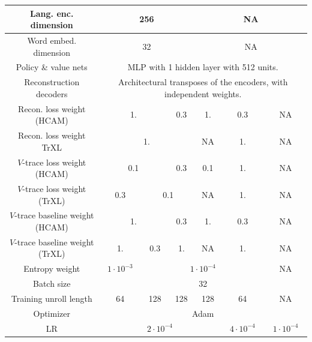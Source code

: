 \begin{table}[H]
{\begin{tabular}{|c|c|c|c|c|c|c|}
      Lang. enc. dimension & \multicolumn{3}{c|}{256} & \multicolumn{3}{c|}{NA} \\ \hline
      Word embed. dimension & \multicolumn{3}{c|}{32} & \multicolumn{3}{c|}{NA} \\ \hline
      \hline
      Policy \& value nets & \multicolumn{6}{c|}{MLP with 1 hidden layer with 512 units.} \\ \hline
      Reconstruction decoders & \multicolumn{6}{c|}{Architectural transposes of the encoders, with independent weights.} \\ \hline
      \hline
      Recon. loss weight (HCAM) & \multicolumn{2}{c|}{1.} & 0.3 & 1. & 0.3 & NA \\ \hline
      Recon. loss weight TrXL & \multicolumn{3}{c|}{1.} & NA & 1. & NA\\ \hline
      \(V\)-trace loss weight (HCAM) & \multicolumn{2}{c|}{0.1} & 0.3 & 0.1 & 1. & NA \\ \hline
      \(V\)-trace loss weight (TrXL) & 0.3 & \multicolumn{2}{c|}{0.1} & NA & 1. & NA \\ \hline
      \(V\)-trace baseline weight (HCAM) & \multicolumn{2}{c|}{1.} & 0.3 & 1. & 0.3  & NA\\ \hline
      \(V\)-trace baseline weight (TrXL) & 1. & 0.3 & 1. & NA & 1.  & NA\\ \hline
      Entropy weight & \(1\cdot10^{-3}\) & \multicolumn{4}{c|}{\(1\cdot10^{-4}\)} & NA\\ \hline
      \hline
      Batch size & \multicolumn{6}{c|}{32} \\ \hline
      Training unroll length & 64 & 128 & 128 & 128 & 64 & NA \\ \hline
      \hline 
      Optimizer & \multicolumn{6}{c|}{Adam \citep{kingma2014adam}} \\ \hline
      LR & \multicolumn{4}{c|}{\(2\cdot10^{-4}\)} & \(4\cdot10^{-4}\) & \(1\cdot10^{-4}\) \\ \hline
    \end{tabular}}
    \label{tab:app:hyper}
\end{table}

